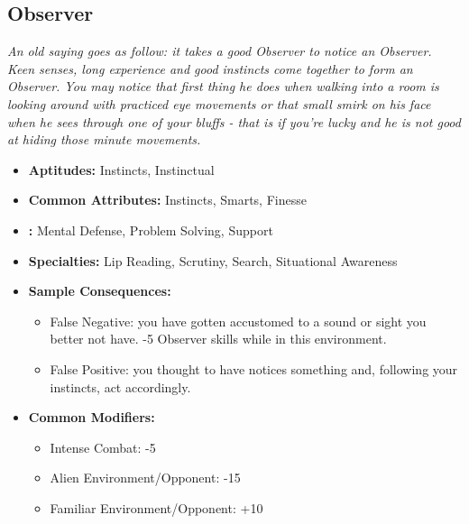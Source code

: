 	 \subsection{Observer}\label{Observer}
		 \textit{An old saying goes as follow: it takes a good Observer to notice an Observer.
		Keen senses, long experience and good instincts come together to form an Observer.
		You may notice that first thing he does when walking into a room is looking around with practiced eye movements or that small smirk on his face when he sees through one of your bluffs - that is if you're lucky and he is not good at hiding those minute movements.}
		 \begin{itemize}
		 	\item \textbf{Aptitudes:} Instincts, Instinctual
		 	\item \textbf{Common Attributes:} Instincts, Smarts, Finesse
		 	\item \textbf{:} Mental Defense, Problem Solving, Support
		 	\item \textbf{Specialties:} Lip Reading, Scrutiny, Search, Situational Awareness
		 	\item \textbf{Sample Consequences:} 
		 	\begin{itemize}
		 		\item False Negative: you have gotten accustomed to a sound or sight you better not have. -5 Observer skills while in this environment.
		 		\item False Positive: you thought to have notices something and, following your instincts, act accordingly.
		 	\end{itemize}
		 	\item \textbf{Common Modifiers:}
		 	\begin{itemize}
		 		\item Intense Combat: -5
		 		\item Alien Environment/Opponent: -15
		 		\item Familiar Environment/Opponent: +10
		 	\end{itemize}
		 \end{itemize}

